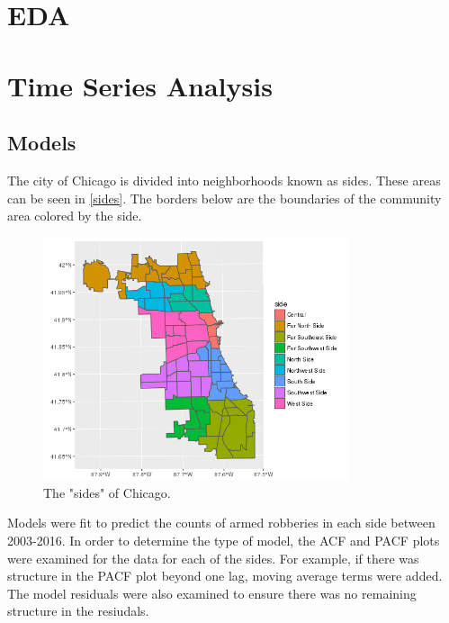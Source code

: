 \documentclass{article} %
\newcommand{\new}{\marginpar{NEW}}
\begin{document}
\section{EDA}

\section{Time Series Analysis}

\subsection{Models}

\noindent The city of Chicago is divided into neighborhoods known as sides. These areas can be seen in \autoref{sides}. The borders below are the boundaries of the community area colored by the side.  

\begin{figure}[h]
\begin{center}

\includegraphics[width=0.8\textwidth,keepaspectratio]{CopyOfside.png}
\caption{The "sides" of Chicago.}
\label{sides}
\end{center}
\end{figure}

\noindent Models were fit to predict the counts of armed robberies in each side between 2003-2016. In order to determine the type of model, the ACF and PACF plots were examined for the data for each of the sides. For example, if there was structure in the PACF plot beyond one lag, moving average terms were added. The model residuals were also examined to ensure there was no remaining structure in the resiudals. 


\new
\end{document}
